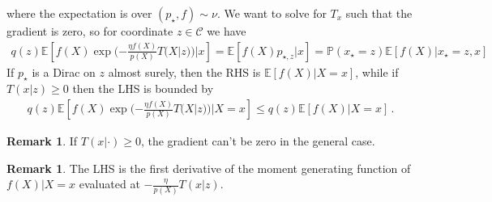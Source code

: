\documentclass{article}
\theoremstyle{plain}
\theoremstyle{definition}
\newtheorem{remark}[theorem]{Remark}
\theoremstyle{remark}
\newcommand{\E}{\mathbb E}
\newcommand{\PP}{\mathbb P}
\newcommand{\cC}{\mathcal C}
\theoremstyle{definition}
\begin{document}
where the expectation is over $(p_\star, f) \sim \nu$.
We want to solve for $T_x$ such that the gradient is zero, so for coordinate $z \in \cC$ we have
\begin{align}
    q(z) \E\!\left[
        f(X)\exp(- \tfrac{\eta f(X)}{p(X)} T(X|z))
        | x
        \right]
    =
    \E\!\left[
        f(X) p_{\star, z}
        | x
        \right]
    =
    \PP(x_\star = z)
    \E\!\left[
        f(X)
        | x_\star = z, x
        \right]
    \label{eq:zero-grad}
\end{align}
If $p_\star$ is a Dirac on $z$ almost surely, then the RHS is $\E[f(X)|X=x]$,
while if $T(x|z) \geq 0$ then the LHS is bounded by
\begin{align*}
    q(z)
    \E\!\left[
        f(X)\exp(- \tfrac{\eta f(X)}{p(X)} T(X|z))
        | X = x
        \right]
    \leq
    q(z)
    \E\!\left[f(X)| X = x\right]\,.
\end{align*}
\begin{remark}
    If $T(x|\cdot) \geq 0$, the gradient can't be zero in the general case.
\end{remark}
\begin{remark}
    The LHS is the first derivative of the moment generating function of $f(X)|X=x$ evaluated at $-\frac{\eta}{p(X)} T(x|z)$.
\end{remark}
\end{document}

